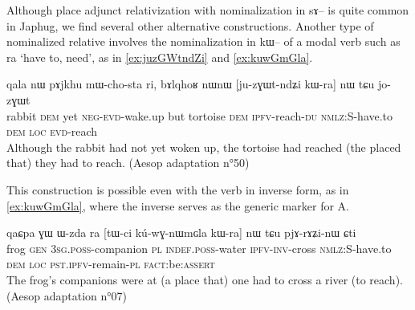 \documentclass[oldfontcommands,oneside,a4paper,11pt]{article}
\newcommand{\ipa}[1]{{\phon #1}} %
\newcommand{\topic}{\textsc{dem}}
\begin{document}
Although place adjunct relativization with nominalization in \ipa{sɤ}-- is quite common in Japhug, we find several other alternative constructions. Another type of nominalized relative involves the nominalization in \ipa{kɯ}-- of a modal verb such as \ipa{ra} `have to, need', as in  \ref{ex:juzGWtndZi} and \ref{ex:kuwGmGla}.

\begin{exe}
   \ex \label{ex:juzGWtndZi}
 \gll
\ipa{qala}   	\ipa{nɯ}   	\ipa{pɤjkhu}   	\ipa{mɯ-cho-sta}   	\ipa{ri,}   	\ipa{bɤlqhoʁ}   	\ipa{nɯnɯ}   	[\ipa{ju-zɣɯt-ndʑi}   	\ipa{kɯ-ra}]   	\ipa{nɯ} \ipa{tɕu}   	\ipa{jo-zɣɯt}   \\
rabbit \topic{} yet \textsc{neg-evd}-wake.up but tortoise \topic{} \textsc{ipfv}-reach-\textsc{du} \textsc{nmlz:S}-have.to \topic{} \textsc{loc} \textsc{evd}-reach \\
\glt Although the rabbit had not yet woken up, the tortoise had reached (the placed that) they had to reach.
(Aesop adaptation n°50)
\end{exe}

This construction is possible even with the verb in inverse form, as in \ref{ex:kuwGmGla}, where the inverse serves as the generic marker for A.
\begin{exe}
   \ex \label{ex:kuwGmGla}
 \gll
\ipa{qaɕpa}   	\ipa{ɣɯ}   	\ipa{ɯ-zda}   	\ipa{ra}   	[\ipa{tɯ-ci}   	\ipa{kú-wɣ-nɯmɢla}   	\ipa{kɯ-ra}]   	\ipa{nɯ} \ipa{tɕu}   	\ipa{pjɤ-rɤʑi-nɯ}   	\ipa{ɕti}   \\
frog \textsc{gen}  \textsc{3sg.poss}-companion \textsc{pl} \textsc{indef.poss}-water \textsc{ipfv-inv}-cross \textsc{nmlz:S}-have.to \topic{} \textsc{loc} \textsc{pst.ipfv}-remain-\textsc{pl} \textsc{fact}:be:\textsc{assert} \\
\glt The frog's companions were at (a place that) one had to cross a river (to reach). (Aesop adaptation n°07)
\end{exe}

\end{document}

